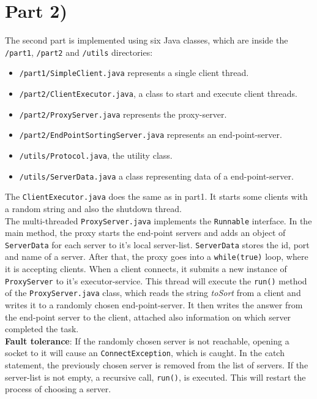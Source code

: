 \documentclass{article}
\begin{document}
  \section*{Part 2)} 
    
    The second part is implemented using six Java classes, which are inside the \texttt{/part1}, \texttt{/part2} and \texttt{/utils} directories:
    \begin{itemize}
      \item \texttt{/part1/SimpleClient.java} represents a single client thread.
      \item \texttt{/part2/ClientExecutor.java}, a class to start and execute client threads.
      \item \texttt{/part2/ProxyServer.java} represents the proxy-server.
      \item \texttt{/part2/EndPointSortingServer.java} represents an end-point-server.
      \item \texttt{/utils/Protocol.java}, the utility class.
      \item \texttt{/utils/ServerData.java} a class representing data of a end-point-server.
    \end{itemize}
    The \texttt{ClientExecutor.java} does the same as in part1. It starts some clients with a random string and also the shutdown thread.\\
    The multi-threaded \texttt{ProxyServer.java} implements the \texttt{Runnable} interface. In the main method, the proxy starts the end-point servers and adds an object of \texttt{ServerData} for each server to it's local server-list. \texttt{ServerData} stores the id, port and name of a server. After that, the proxy goes into a \texttt{while(true)} loop, where it is accepting clients. When a client connects, it submits a new instance of \texttt{ProxyServer} to it's executor-service. This thread will execute the \texttt{run()} method of the \texttt{ProxyServer.java} class, which reads the string \textit{toSort} from a client and writes it to a randomly chosen end-point-server. It then writes the answer from the end-point server to the client, attached also information on which server completed the task.\\
    \textbf{Fault tolerance}: If the randomly chosen server is not reachable, opening a socket to it will cause an \texttt{ConnectException}, which is caught. In the catch statement, the previously chosen server is removed from the list of servers. If the server-list is not empty, a recursive call, \texttt{run()}, is executed. This will restart the process of choosing a server.\\
\end{document}
